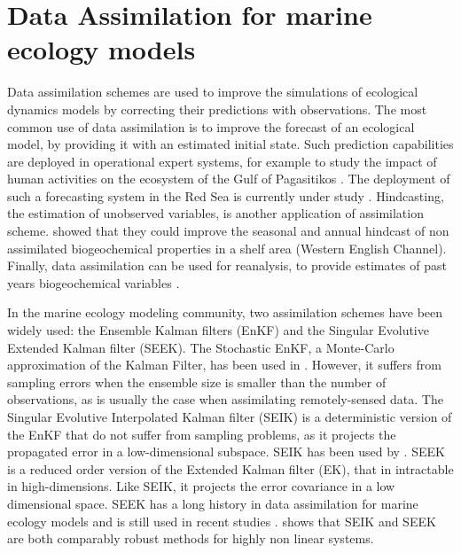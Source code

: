 \section{Data Assimilation for marine ecology models}

Data assimilation schemes are used to improve the simulations of ecological dynamics models by correcting their predictions with observations. The most common use of data assimilation is to improve the forecast of an ecological model, by providing it with an estimated initial state. Such prediction capabilities are deployed in operational expert systems, for example to study the impact of human activities on the ecosystem of the Gulf of Pagasitikos \cite{Korres2012}. The deployment of such a forecasting system in the Red Sea is currently under study \cite{Triantafyllou2014}. Hindcasting, the estimation of unobserved variables, is another application of assimilation scheme. \cite{Ciavatta2011}  showed that they could improve the seasonal and annual hindcast of non assimilated biogeochemical properties in a shelf area (Western English Channel). Finally, data assimilation can be used for reanalysis, to provide estimates of past years biogeochemical variables \cite{Fontana2013}. 

In the marine ecology modeling community, two assimilation schemes have been widely used: the Ensemble Kalman filters (EnKF) and the Singular Evolutive Extended Kalman filter (SEEK). The Stochastic EnKF, a Monte-Carlo approximation of the Kalman Filter, has been used in \cite{Ciavatta2011, Ciavatta2014}. However, it suffers from sampling errors when the ensemble size is smaller than the number of observations, as is usually the case when assimilating remotely-sensed data. The Singular Evolutive Interpolated Kalman filter (SEIK) is a deterministic version of the EnKF that do not suffer from sampling problems, as it projects the propagated error in a low-dimensional subspace. SEIK has been used by \cite{Triantafyllou2012, Korres2012}. SEEK is a reduced order version of the Extended Kalman filter (EK), that in intractable in high-dimensions. Like SEIK, it projects the error covariance in a low dimensional space. SEEK has a long history in data assimilation for marine ecology models and is still used in recent studies \cite{Fontana2013, Korres2012, Butenschon2012}. \cite{Korres2012} shows that SEIK and SEEK are both comparably robust methods for highly non linear systems.

